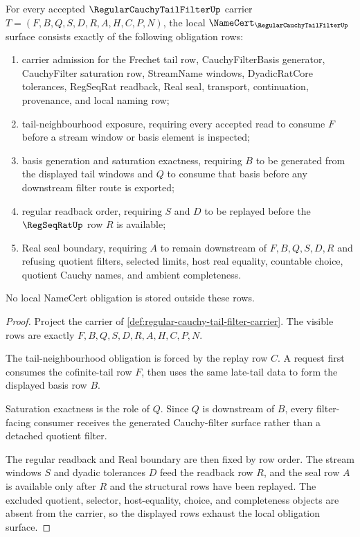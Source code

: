 \begin{theorem}
\label{thm:regular-cauchy-tail-filter-namecert-obligations}
For every accepted $\RegularCauchyTailFilterUp$ carrier $T=(F,B,Q,S,D,R,A,H,C,P,N)$, the local $\NameCert_{\RegularCauchyTailFilterUp}$ surface consists exactly of the following obligation rows:
\begin{enumerate}
\item carrier admission for the Frechet tail row, CauchyFilterBasis generator, CauchyFilter saturation row, StreamName windows, DyadicRatCore tolerances, RegSeqRat readback, Real seal, transport, continuation, provenance, and local naming row;
\item tail-neighbourhood exposure, requiring every accepted read to consume $F$ before a stream window or basis element is inspected;
\item basis generation and saturation exactness, requiring $B$ to be generated from the displayed tail windows and $Q$ to consume that basis before any downstream filter route is exported;
\item regular readback order, requiring $S$ and $D$ to be replayed before the $\RegSeqRatUp$ row $R$ is available;
\item Real seal boundary, requiring $A$ to remain downstream of $F,B,Q,S,D,R$ and refusing quotient filters, selected limits, host real equality, countable choice, quotient Cauchy names, and ambient completeness.
\end{enumerate}
No local NameCert obligation is stored outside these rows.
\end{theorem}
\begin{proof}
Project the carrier of \autoref{def:regular-cauchy-tail-filter-carrier}. The visible rows are exactly $F,B,Q,S,D,R,A,H,C,P,N$.

The tail-neighbourhood obligation is forced by the replay row $C$. A request first consumes the cofinite-tail row $F$, then uses the same late-tail data to form the displayed basis row $B$.

Saturation exactness is the role of $Q$. Since $Q$ is downstream of $B$, every filter-facing consumer receives the generated Cauchy-filter surface rather than a detached quotient filter.

The regular readback and Real boundary are then fixed by row order. The stream windows $S$ and dyadic tolerances $D$ feed the readback row $R$, and the seal row $A$ is available only after $R$ and the structural rows have been replayed. The excluded quotient, selector, host-equality, choice, and completeness objects are absent from the carrier, so the displayed rows exhaust the local obligation surface.
\end{proof}

